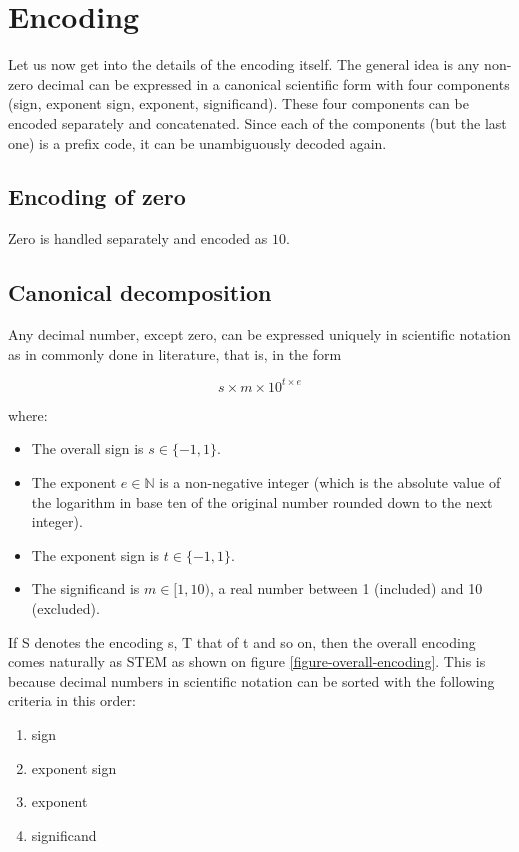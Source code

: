 \documentclass{acm_proc_article-sp}
\begin{document}
\section{Encoding}
\label{section-encoding}
Let us now get into the details of the encoding itself. The general idea is any non-zero decimal can be expressed in a canonical scientific form with four components (sign, exponent sign, exponent, significand). These four components can be encoded separately and concatenated. Since each of the components (but the last one) is a prefix code, it can be unambiguously decoded again.

\subsection{Encoding of zero}

Zero is handled separately and encoded as $10$.

\subsection{Canonical decomposition}

Any decimal number, except zero, can be expressed uniquely in scientific notation as in commonly done in literature, that is, in the form

$$s\times m \times10^{t\times e}$$

where:

\begin{itemize}
\item The overall sign is $s\in \{-1, 1\}$.
\item The exponent $e\in \mathbb{N}$ is a non-negative integer (which is the absolute value of the logarithm in base ten of the original number rounded down to the next integer).
\item The exponent sign is $t\in \{-1, 1\}$.
\item The significand is $m\in [1,10)$, a real number between 1 (included) and 10 (excluded).
\end{itemize}

If S denotes the encoding s, T that of t and so on, then the overall encoding comes naturally as STEM as shown on figure \ref{figure-overall-encoding}. This is because decimal numbers in scientific notation can be sorted with the following criteria in this order:
\begin{enumerate}
\item sign
\item exponent sign
\item exponent
\item significand
\end{enumerate}
\end{document}
